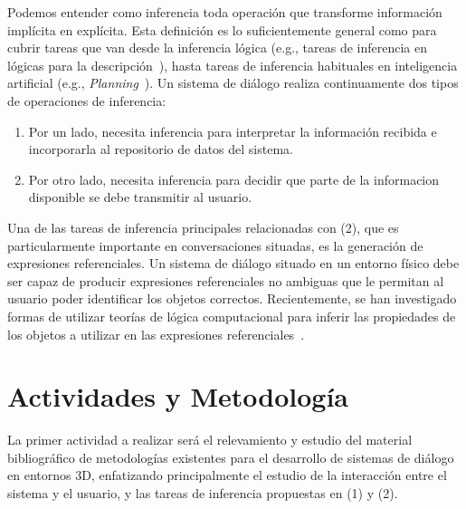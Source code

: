 \documentclass[10.9pt,a4paper]{article}
\begin{document}
Podemos entender como inferencia toda operaci\'on que transforme 
informaci\'on impl\'icita en expl\'icita. Esta definici\'on es lo 
suficientemente general como para cubrir tareas que van desde la 
inferencia l\'ogica (e.g., tareas de inferencia en l\'ogicas para la 
descripci\'on~\citep{DBLP:conf/dlog/2003handbook,ARECES:thesis}), hasta tareas de 
inferencia habituales en inteligencia artificial (e.g., 
\emph{Planning}~\citep{nau04,beno:mus11}). 
Un sistema de di\'alogo realiza continuamente dos tipos de operaciones de 
inferencia:
\begin{enumerate}[(1)]
    \item  Por un lado, necesita inferencia para interpretar la 
    informaci\'on recibida e incorporarla al repositorio de datos del sistema.
    \item Por otro lado, necesita inferencia para decidir que parte de la 
    informacion disponible se debe transmitir al usuario.
\end{enumerate}

Una de las tareas de inferencia principales relacionadas con (2), que es 
particularmente importante en conversaciones situadas, es la generaci\'on 
de expresiones referenciales. Un sistema de di\'alogo situado en un 
entorno f\'isico debe ser capaz de producir expresiones referenciales no 
ambiguas que le permitan al usuario poder identificar los objetos
correctos. Recientemente, se han investigado formas de utilizar 
teor\'ias de l\'ogica computacional para inferir las propiedades de los 
objetos a utilizar en las expresiones 
referenciales~\citep{arec:refe08,arec:usin11,altamirano-areces-benotti:2012:POSTERS}.




\section{Actividades y Metodolog\'ia}

La primer actividad a realizar ser\'a el relevamiento y estudio del material 
bibliogr\'afico de metodolog\'ias existentes para el desarrollo de sistemas 
de di\'alogo en entornos 3D, enfatizando principalmente el estudio de la
interacci\'on entre el sistema y el usuario, y las tareas de inferencia 
propuestas en (1) y (2).
\end{document}

